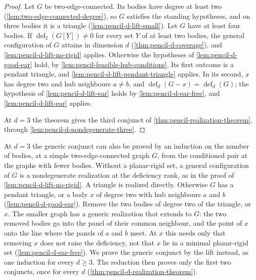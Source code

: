 \begin{proof}
  Let $G$ be two-edge-connected. Its bodies have degree at least two
  (\cref{lem:two-edge-connected-degree}), so $G$ satisfies the standing
  hypotheses, and on three bodies it is a triangle
  (\cref{lem:pencil-d-lift-small}). Let $G$ have at least four bodies. If
  $\operatorname{def}_2(G[Y]) \ne 0$ for every set $Y$ of at least two
  bodies, the general configuration of $G$ attains in dimension $d$
  (\cref{thm:pencil-d-coverage}), and \cref{lem:pencil-d-lift-no-rigid}
  applies. Otherwise the hypotheses of \cref{lem:pencil-d-good-ear} hold,
  by \cref{lem:pencil-feasible-hub-conditions}. Its first outcome is a
  pendant triangle, and \cref{lem:pencil-d-lift-pendant-triangle} applies.
  In its second, $x$ has degree two and hub neighbours $a \ne b$, and
  $\operatorname{def}_d(G - x) = \operatorname{def}_d(G)$; the hypothesis
  of \cref{lem:pencil-d-lift-ear} holds by \cref{lem:pencil-d-ear-free},
  and \cref{lem:pencil-d-lift-ear} applies.

  At $d = 3$ the theorem gives the third conjunct of
  \cref{thm:pencil-realization-theorem}, through
  \cref{lem:pencil-d-nondegenerate-three}.
\end{proof}

\begin{remark}[A route without lifts at $d = 3$]
  At $d = 3$ the generic conjunct can also be proved by an induction on
  the number of bodies, at a simple two-edge-connected graph $G$, from
  the conditioned pair at the graphs with fewer bodies. Without a
  planar-rigid set, a general configuration
  of $G$ is a nondegenerate realization at the deficiency rank, as in the
  proof of \cref{lem:pencil-d-lift-no-rigid}. A triangle is realized directly.
  Otherwise $G$ has a pendant triangle, or a body $x$ of degree two with
  hub neighbours $a$ and $b$ (\cref{lem:pencil-d-good-ear}). Remove the
  two bodies of degree two of the triangle, or $x$. The smaller graph has
  a generic realization that extends to $G$: the two removed bodies go
  into the panel of their common neighbour, and the point of $x$ onto the
  line where the panels of $a$ and $b$ meet. At $x$ this needs only that
  removing $x$ does not raise the deficiency, not that $x$ lie in a
  minimal planar-rigid set (\cref{lem:pencil-d-ear-free}). We prove the
  generic conjunct by the lift instead, as one induction for every
  $d \ge 3$. The reduction then proves only the first two conjuncts, once
  for every $d$ (\cref{thm:pencil-d-realization-theorem}).
\end{remark}

